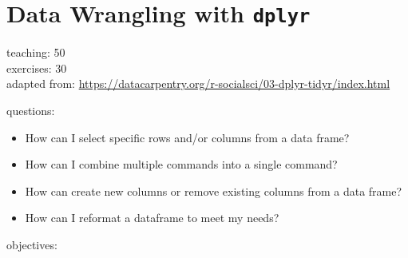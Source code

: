 \documentclass[]{book}
\providecommand{\tightlist}{%
  \setlength{\itemsep}{0pt}\setlength{\parskip}{0pt}}
\begin{document}
\chapter{\texorpdfstring{Data Wrangling with
\texttt{dplyr}}{Data Wrangling with dplyr}}\label{dplyr}

teaching: 50\\
exercises: 30\\
adapted from:
\url{https://datacarpentry.org/r-socialsci/03-dplyr-tidyr/index.html}

questions:

\begin{itemize}
\tightlist
\item
  How can I select specific rows and/or columns from a data frame?\\
\item
  How can I combine multiple commands into a single command?\\
\item
  How can create new columns or remove existing columns from a data
  frame?\\
\item
  How can I reformat a dataframe to meet my needs?
\end{itemize}

objectives:
\end{document}

